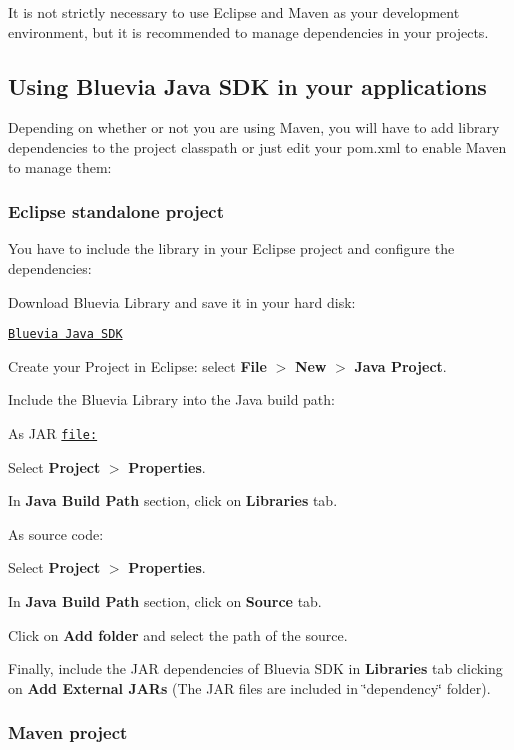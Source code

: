 It is not strictly necessary to use Eclipse and Maven as your development environment, but it is recommended to manage dependencies in your projects.\hypertarget{main_getting_started_library_sec}{}\subsection{Using Bluevia Java SDK in your applications}\label{main_getting_started_library_sec}
Depending on whether or not you are using Maven, you will have to add library dependencies to the project classpath or just edit your pom.xml to enable Maven to manage them:\hypertarget{main_getting_started_library_sec_eclipse}{}\subsubsection{Eclipse standalone project}\label{main_getting_started_library_sec_eclipse}
You have to include the library in your Eclipse project and configure the dependencies:


\begin{DoxyEnumerate}
\item Download Bluevia Library and save it in your hard disk:

\href{http://bluevia.com/#}{\tt Bluevia Java SDK}


\item Create your Project in Eclipse: select {\bfseries File} $>$ {\bfseries New} $>$ {\bfseries Java Project}.


\item Include the Bluevia Library into the Java build path: 
\begin{DoxyItemize}
\item As JAR \href{file:}{\tt file:} 
\begin{DoxyEnumerate}
\item Select {\bfseries Project} $>$ {\bfseries Properties}. 
\item In {\bfseries Java Build Path} section, click on {\bfseries Libraries} tab. 
\end{DoxyEnumerate}
\item As source code: 
\begin{DoxyEnumerate}
\item Select {\bfseries Project} $>$ {\bfseries Properties}. 
\item In {\bfseries Java Build Path} section, click on {\bfseries Source} tab. 
\item Click on {\bfseries Add folder} and select the path of the source. 
\end{DoxyEnumerate}
\end{DoxyItemize}
\item Finally, include the JAR dependencies of Bluevia SDK in {\bfseries Libraries} tab clicking on {\bfseries Add External JARs} (The JAR files are included in \char`\"{}dependency\char`\"{} folder). 
\end{DoxyEnumerate}\hypertarget{main_getting_started_library_sec_maven}{}\subsubsection{Maven project}\label{main_getting_started_library_sec_maven}

